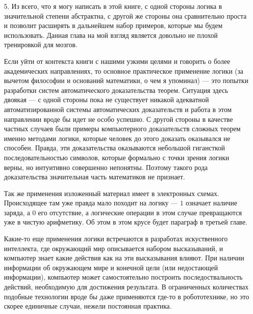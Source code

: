 5. Из всего, что я могу написать в этой книге, с одной стороны логика в значительной степени абстрактна, с другой же стороны она сравнительно проста и позволит расширять в дальнейшем набор примеров, которые мы будем использовать. Данная глава на мой взгляд является довольно не плохой тренировкой для мозгов.

Если уйти от контекста книги с нашими узкими целями и говорить о более академических направлениях, то основное практическое применение логики (за вычетом философии и оснований математики, о чем я упоминал) --- это попытки разработки систем автоматического доказательства теорем. Ситуация здесь двоякая --- с одной стороны пока не существует никакой адекватной автоматизированной системы автоматических доказательств и работа в этом направлении вроде бы идет не особо успешно. С другой стороны в качестве частных случаев были примеры компьютерного доказательств сложных теорем именно методами логики, которые человек до этого доказать оказывался не способен. Правда, эти доказательства оказываются небольшой гигансткой последовательностью символов, которые формально с точки зрения логики верны, но интуитивно совершенно непонятны. Поэтому такого рода доказательства значительная часть математиков не признает.

Так же применения изложенный материал имеет в электронных схемах. Происходящее там уже правда мало походит на логику --- $1$ означает наличие заряда, а $0$ его отсутствие, а логические операции в этом случае превращаются уже в чистую арифметику. Об этом в этом крусе будет параграф в третьей главе.

Какие-то еще применения логики встречаются в разработах искуственного интеллекта, где окружающий мир описывается набором высказываний, и компьютер знает какие действия как на эти высказывания влияют. При наличии информации об окружающем мире и конечной цели (или недостающей информации), компьютер может самостоятельно построить последоствальность действий, необходимую для достижения результата. В ограниченных количествах подобные технологии вроде бы даже применяются где-то в робототехнике, но это скорее единичные случаи, нежели постоянная практика.
